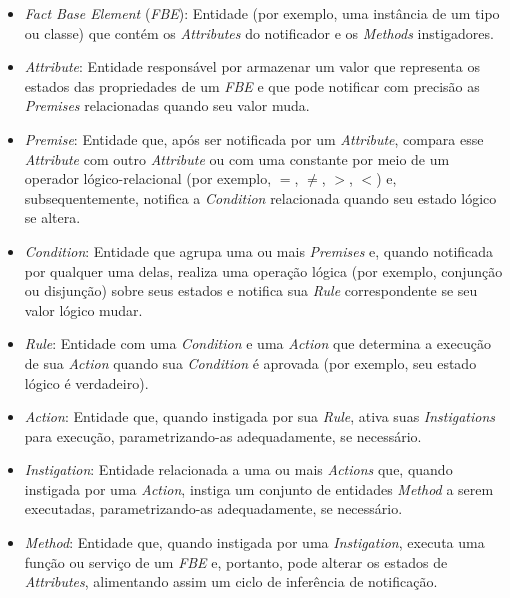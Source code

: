 \begin{itemize}
    \item \textit{Fact Base Element} (\textit{FBE}): Entidade (por exemplo, uma instância de um tipo ou classe) que contém os \textit{Attributes} do notificador e os \textit{Methods} instigadores.
    
    \item \textit{Attribute}: Entidade responsável por armazenar um valor que representa os estados das propriedades de um \textit{FBE} e que pode notificar com precisão as \textit{Premises} relacionadas quando seu valor muda.
    
    \item \textit{Premise}: Entidade que, após ser notificada por um \textit{Attribute}, compara esse \textit{Attribute} com outro \textit{Attribute} ou com uma constante por meio de um operador lógico-relacional (por exemplo, $=$, $\neq$, $>$, $<$) e, subsequentemente, notifica a \textit{Condition} relacionada quando seu estado lógico se altera.
    
    \item \textit{Condition}: Entidade que agrupa uma ou mais \textit{Premises} e, quando notificada por qualquer uma delas, realiza uma operação lógica (por exemplo, conjunção ou disjunção) sobre seus estados e notifica sua \textit{Rule} correspondente se seu valor lógico mudar. 
    
    \item \textit{Rule}: Entidade com uma \textit{Condition} e uma \textit{Action} que determina a execução de sua \textit{Action} quando sua \textit{Condition} é aprovada (por exemplo, seu estado lógico é verdadeiro).
    \item \textit{Action}: Entidade que, quando instigada por sua \textit{Rule}, ativa suas \textit{Instigations} para execução, parametrizando-as adequadamente, se necessário.
    
    \item \textit{Instigation}: Entidade relacionada a uma ou mais \textit{Actions} que, quando instigada por uma \textit{Action}, instiga um conjunto de entidades \textit{Method} a serem executadas, parametrizando-as adequadamente, se necessário.
    
    \item \textit{Method}: Entidade que, quando instigada por uma \textit{Instigation}, executa uma função ou serviço de um \textit{FBE} e, portanto, pode alterar os estados de \textit{Attributes}, alimentando assim um ciclo de inferência de notificação.
\end{itemize}



